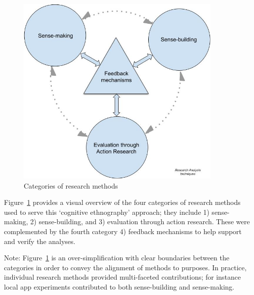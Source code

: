 \begin{figure}
    \centering
    \includegraphics[width=10cm]{images/my/analysis-techniques-in-PhD-08-Nov-2021.jpeg}
    \caption{Categories of research methods}
    \label{fig:categories-of-research-methods}
\end{figure}


 Figure~\ref{fig:categories-of-research-methods} provides a visual overview of the four categories of research methods used to serve this `cognitive ethnography' approach; they include 1) sense-making, 2) sense-building, and 3) evaluation through action research. These were complemented by the fourth category 4) feedback mechanisms to help support and verify the analyses. 

Note: Figure~\ref{fig:categories-of-research-methods} is an over-simplification with clear boundaries between the categories in order to convey the alignment of methods to purposes. In practice, individual research methods provided multi-faceted contributions; for instance local app experiments contributed to both sense-building and sense-making.

\medskip


